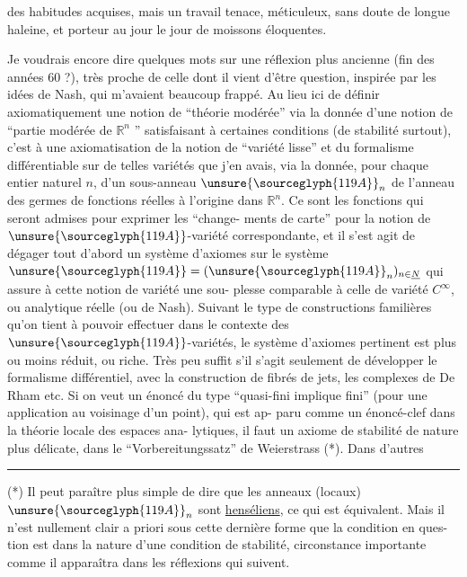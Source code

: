 
des habitudes acquises, mais un travail tenace, méticuleux, sans
doute de longue haleine, et porteur au jour le jour de moissons
éloquentes.

Je voudrais encore dire quelques mots sur une réflexion
plus ancienne (fin des années 60 ?), très proche de celle dont il
vient d'être question, inspirée par les idées de Nash, qui m'avaient
beaucoup frappé. Au lieu ici de définir axiomatiquement une notion
de ``théorie modérée'' via la donnée d'une notion de ``partie modérée
de $\mathbb{R}^n$ '' satisfaisant à certaines conditions (de stabilité surtout),
c'est à une axiomatisation de la notion de ``variété lisse'' et du
formalisme différentiable sur de telles variétés que j'en avais,
via la donnée, pour chaque entier naturel $n$, d'un sous-anneau
$\unsure{\sourceglyph{119A}}_n$ de l'anneau des germes de fonctions réelles à l'origine dans $\mathbb{R}^n$.
Ce sont les fonctions qui seront admises pour exprimer les ``change-%
ments de carte'' pour la notion de $\unsure{\sourceglyph{119A}}$-variété correspondante, et il
s'est agit de dégager tout d'abord un système d'axiomes sur le
système $\unsure{\sourceglyph{119A}} = (\unsure{\sourceglyph{119A}}_n)_{n\in\underline{N}}$ qui assure à cette notion de variété une sou-%
plesse comparable à celle de variété $C^\infty$, ou analytique réelle
(ou de Nash). Suivant le type de constructions familières qu'on
tient à pouvoir effectuer dans le contexte des $\unsure{\sourceglyph{119A}}$-variétés, le
système d'axiomes pertinent est plus ou moins réduit, ou riche.
Très peu suffit s'il s'agit seulement de développer le formalisme
différentiel, avec la construction de fibrés de jets, les complexes
de De Rham etc. Si on veut un énoncé du type ``quasi-fini implique
fini'' (pour une application au voisinage d'un point), qui est ap-%
paru comme un énoncé-clef dans la théorie locale des espaces ana-%
lytiques, il faut un axiome de stabilité de nature plus délicate,
dans le ``Vorbereitungssatz'' de Weierstrass (*). Dans d'autres

\rule{4cm}{0.4pt}

(*) Il peut paraître plus simple de dire que les anneaux (locaux)
$\unsure{\sourceglyph{119A}}_n$ sont \uline{henséliens}, ce qui est équivalent. Mais il n'est nullement
clair a priori sous cette dernière forme que la condition en ques-%
tion est dans la nature d'une condition de stabilité, circonstance
importante comme il apparaîtra dans les réflexions qui suivent.

